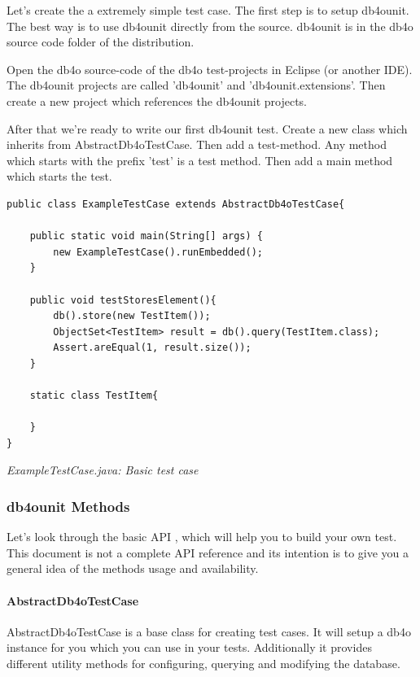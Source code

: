 Let's create the a extremely simple test case. The first step is to setup db4ounit. The best way is to use db4ounit directly from the source. db4ounit is in the db4o source code folder of the distribution.

Open the db4o source-code of the db4o test-projects in Eclipse (or another IDE). The db4ounit projects are called 'db4ounit' and 'db4ounit.extensions'. Then create a new project which references the db4ounit projects.

After that we're ready to write our first db4ounit test. Create a new class which inherits from AbstractDb4oTestCase. Then add a test-method. Any method which starts with the prefix 'test' is a test method. Then add a main method which starts the test.

\begin{lstlisting}
public class ExampleTestCase extends AbstractDb4oTestCase{

    public static void main(String[] args) {
        new ExampleTestCase().runEmbedded();
    }

    public void testStoresElement(){
        db().store(new TestItem());
        ObjectSet<TestItem> result = db().query(TestItem.class);
        Assert.areEqual(1, result.size());
    }

    static class TestItem{

    }
}
\end{lstlisting}

{\small\itshape ExampleTestCase.java: Basic test case\par}
\medskip

\subsubsection{db4ounit Methods}
\label{ref:community-working-with-source-db4o-testing-framework-db4ounit-methods}

Let's look through the basic API , which will help you to build your own test. This document is not a complete API reference and its intention is to give you a general idea of the methods usage and availability.

\paragraph*{AbstractDb4oTestCase}

AbstractDb4oTestCase is a base class for creating test cases. It will setup a db4o instance for you which you can use in your tests. Additionally it provides different utility methods for configuring, querying and modifying the database.

